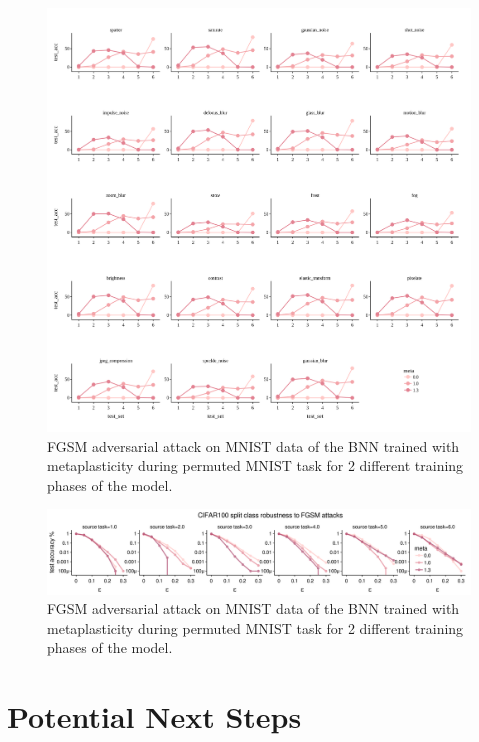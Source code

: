 \documentclass[manuscript,screen,review]{acmart}
\begin{document}
\begin{figure}
    \centering
    \includegraphics[width=1\textwidth]{figures/report/Fig7.png}
    \caption{FGSM adversarial attack on MNIST data of the BNN trained with metaplasticity during permuted MNIST task for 2 different training phases of the model. 
    }
    \label{fig:fig7}
\end{figure}


\begin{figure}
    \centering
    \includegraphics[width=\textwidth]{figures/report/Fig8.pdf}
    \caption{FGSM adversarial attack on MNIST data of the BNN trained with metaplasticity during permuted MNIST task for 2 different training phases of the model. 
    }
    \label{fig:fig8}
\end{figure}

\section{Potential Next Steps}
\end{document}
